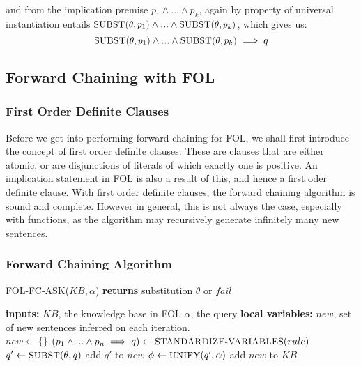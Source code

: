 \documentclass[12pt]{article}
\begin{document}
and from the implication premise $p_1 \land ... \land p_k$, again by property of universal instantiation entails $\textsc{\small{SUBST($\theta, p_1$)}} \land ... \land \textsc{\small{SUBST($\theta, p_k$)}}$, which gives us:
\begin{equation*}
\textsc{\small{SUBST($\theta, p_1$)}} \land ... \land \textsc{\small{SUBST($\theta, p_k$)}} \implies q
\end{equation*}
\subsection{Forward Chaining with FOL}

\subsubsection{First Order Definite Clauses}

Before we get into performing forward chaining for FOL, we shall first introduce the concept of first order definite clauses. These are clauses that are either atomic, or are disjunctions of literals of which exactly one is positive. An implication statement in FOL is also a result of this, and hence a first oder definite clause. With first order definite clauses, the forward chaining algorithm is sound and complete. However in general, this is not always the case, especially with functions, as the algorithm may recursively generate infinitely many new sentences.

\pagebreak

\subsubsection{Forward Chaining Algorithm}

\begin{algorithm}
\caption{\textsc{\small{FOL-FC-ASK($KB, \alpha$)}}\textbf{ returns} substitution $\theta$ or $fail$}\label{euclid}
\begin{algorithmic}[1]
\State \textbf{inputs: } $KB$, the
\State knowledge base in FOL
\State $\alpha$, the query
\State \textbf{local variables:}
\State $new$, set of new sentences inferred on each iteration.\\

\State $new \leftarrow \{ \}$
\State $(p_1 \land ... \land p_n \implies q) \leftarrow \textsc{\small{STANDARDIZE-VARIABLES}}(rule)$
\State $q' \leftarrow \textsc{\small{SUBST}}(\theta, q)$
\State add $q'$ to $new$
\State $\phi \leftarrow \textsc{\small{UNIFY}}(q', \alpha)$
 \Return{$\phi$}
\EndIf
\EndIf
\EndFor
\State add $new$ to $KB$
\EndFor
\EndWhile
\State {}
\end{algorithmic}
\end{algorithm}
\end{document}
